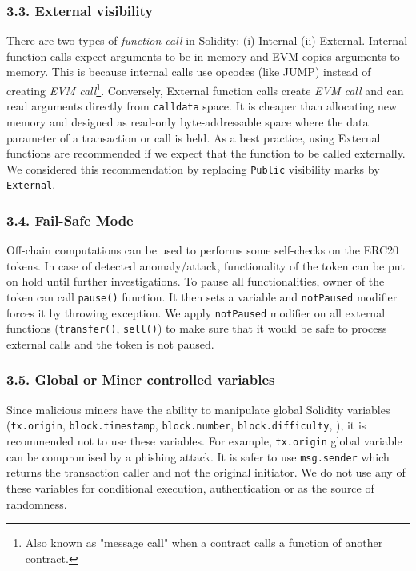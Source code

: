 \subsubsection*{3.3. External visibility}
There are two types of \textit{function call} in Solidity\cite{SolidityDoc}: (i) Internal (ii) External. Internal function calls expect arguments to be in memory and EVM copies arguments to memory. This is because internal calls use opcodes (like JUMP) instead of creating \textit{EVM call}\footnote{Also known as "message call" when a contract calls a function of another contract.}. Conversely, External function calls create \textit{EVM call} and can read arguments directly from \texttt{calldata} space. It is cheaper than allocating new memory and designed as read-only byte-addressable space where the data parameter of a transaction or call is held\cite{EthInDepth}. As a best practice, using External functions are recommended if we expect that the function to be called externally. We considered this recommendation by replacing \texttt{Public} visibility marks by \texttt{External}.

\subsubsection*{3.4. Fail-Safe Mode}
Off-chain computations can be used to performs some self-checks on the ERC20 tokens. In case of detected anomaly/attack, functionality of the token can be put on hold until further investigations. To pause all functionalities, owner of the token can call \texttt{pause()} function. It then sets a variable and \texttt{notPaused} modifier forces it by throwing exception. We apply \texttt{notPaused} modifier on all external functions (\eg \texttt{transfer()}, \texttt{sell()}) to make sure that it would be safe to process external calls and the token is not paused.

\subsubsection*{3.5. Global or Miner controlled variables}
Since malicious miners have the ability to manipulate global Solidity variables (\eg \texttt{tx.origin}, \texttt{block.timestamp}, \texttt{block.number}, \texttt{block.difficulty}, \etc), it is recommended not to use these variables. For example, \texttt{tx.origin} global variable can be compromised by a phishing attack. It is safer to use \texttt{msg.sender} which returns the transaction caller and not the original initiator. We do not use any of these variables for conditional execution, authentication or as the source of randomness.

